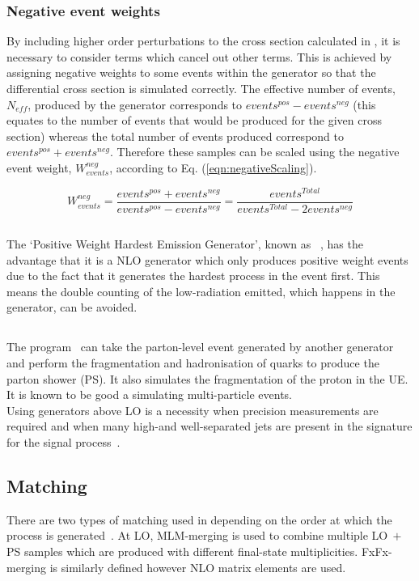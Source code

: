 \subsubsection{Negative event weights}
By including higher order perturbations to the cross section calculated in \aMCATNLO, it is necessary to consider terms which cancel out other terms. This is achieved by assigning negative weights to some events within the generator so that the differential cross section is simulated correctly. The effective number of events, $N_{eff}$, produced by the generator corresponds to $events^{pos} - events^{neg}$ (this equates to the number of events that would be produced for the given cross section) whereas the total number of events produced correspond to $events^{pos} + events^{neg}$. Therefore these samples can be scaled using the negative event weight, $W_{events}^{neg}$, according to Eq. (\ref{eqn:negativeScaling}).

\begin{equation}
\label{eqn:negativeScaling}
W_{events}^{neg} = \frac{events^{pos} + events^{neg}}{events^{pos} - events^{neg}} = \frac{events^{Total}}{ events^{Total} - 2events^{neg}}
\end{equation}


\subsection{\POWHEG}
The `Positive Weight Hardest Emission Generator', known as \POWHEG~\cite{POWHEG}, has the advantage that it is a NLO generator which only produces positive weight events due to the fact that it generates the hardest process in the event first. This means the double counting of the low-\pt radiation emitted, which happens in the \aMCATNLO generator, can be avoided.  
\subsection{\PYTHIA}
The \PYTHIA program~\cite{pythia} can take the parton-level event generated by another generator and perform the fragmentation and hadronisation of quarks to produce the parton shower (PS). It also simulates the fragmentation of the proton in the UE. It is known to be good a simulating multi-particle events.\\

Using generators above LO is a necessity when precision measurements are required and when many high-\pt and well-separated jets are present in the signature for the signal process~\cite{Degrande:2014sta}. 

\subsection{Matching}
There are two types of matching used in \MADGRAPH depending on the order at which the process is generated~\cite{Degrande:2014sta}. At LO, MLM-merging is used to combine multiple LO$~+~$PS samples which are produced with different final-state multiplicities. FxFx-merging is similarly defined however NLO matrix elements are used.



